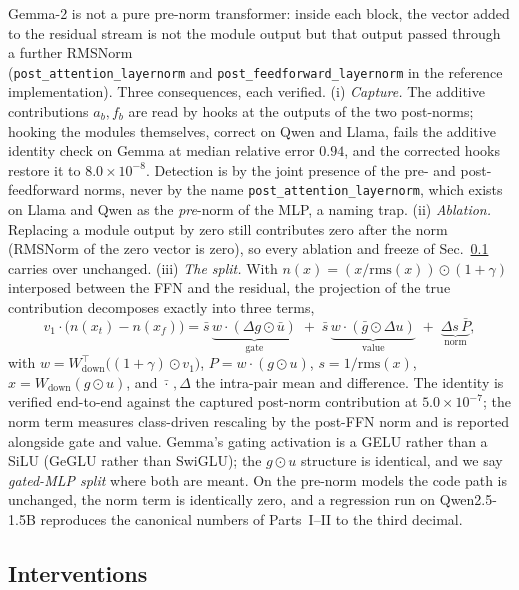 \documentclass[11pt]{article}
\begin{document}
Gemma-2 is not a pure pre-norm transformer: inside each block, the vector
added to the residual stream is not the module output but that output passed
through a further RMSNorm \\(\texttt{post\_attention\_layernorm} and
\texttt{post\_feedforward\_layernorm} in the reference implementation).
Three consequences, each verified. (i) \emph{Capture.} The additive
contributions $a_b, f_b$ are read by hooks at the outputs of the two
post-norms; hooking the modules themselves, correct on Qwen and Llama,
fails the additive identity check on Gemma at median relative error $0.94$,
and the corrected hooks restore it to $8.0 \times 10^{-8}$. Detection is by
the joint presence of the pre- and post-feedforward norms, never by the
name \texttt{post\_attention\_layernorm}, which exists on Llama and Qwen as
the \emph{pre}-norm of the MLP, a naming trap. (ii) \emph{Ablation.}
Replacing a module output by zero still contributes zero after the norm
(RMSNorm of the zero vector is zero), so every ablation and freeze of
Sec.~\ref{b:sec:interventions} carries over unchanged. (iii) \emph{The
split.} With $n(x) = (x/\mathrm{rms}(x)) \odot (1+\gamma)$ interposed
between the FFN and the residual, the projection of the true contribution
decomposes exactly into three terms,
\begin{equation}
v_1 \cdot \big(n(x_t) - n(x_f)\big)
= \bar{s}\,\underbrace{w \cdot (\Delta g \odot \bar u)}_{\text{gate}}
\;+\; \bar{s}\,\underbrace{w \cdot (\bar g \odot \Delta u)}_{\text{value}}
\;+\; \underbrace{\Delta s\, \bar P}_{\text{norm}},
\label{b:eq:sandwich}
\end{equation}
with $w = W_{\mathrm{down}}^{\top}\big((1+\gamma) \odot v_1\big)$,
$P = w \cdot (g \odot u)$, $s = 1/\mathrm{rms}(x)$,
$x = W_{\mathrm{down}}(g \odot u)$, and $\bar{\cdot}\,, \Delta$ the
intra-pair mean and difference. The identity is verified end-to-end
against the captured post-norm contribution at $5.0 \times 10^{-7}$; the
norm term measures class-driven rescaling by the post-FFN norm and is
reported alongside gate and value. Gemma's gating activation is a GELU
rather than a SiLU (GeGLU rather than SwiGLU); the $g \odot u$ structure
is identical, and we say \emph{gated-MLP split} where both are meant. On
the pre-norm models the code path is unchanged, the norm term is
identically zero, and a regression run on Qwen2.5-1.5B reproduces the
canonical numbers of Parts~I--II to the third decimal.

\subsection{Interventions}
\label{b:sec:interventions}
\end{document}
